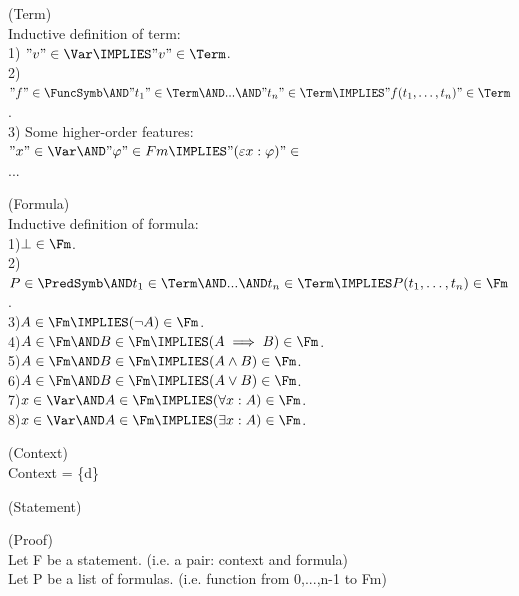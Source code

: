 \begin{definition}(Term)\\
Inductive definition of term:\\
1) $"v"\in\Var \IMPLIES "v"\in\Term$.\\
2) 
$"f"\in\FuncSymb\AND "t_1"\in\Term \AND ...\AND "t_n"\in\Term  \IMPLIES "f(t_1,\dots,t_n)"\in\Term$.\\
3) Some higher-order features:\\
$"x"\in\Var\AND"\varphi"\in Fm \IMPLIES "(\varepsilon x : \varphi)"\in $\\
...

\end{definition}

\begin{definition}(Formula)\\
Inductive definition of formula:\\
1)$\bot\in\Fm$.\\
2)$P\in\PredSymb\AND t_1\in\Term \AND ...\AND t_n\in\Term  \IMPLIES P(t_1,\dots,t_n)\in\Fm$.\\
3)$A\in\Fm \IMPLIES (\neg A)\in\Fm$.\\
4)$A\in\Fm \AND B\in\Fm \IMPLIES (A\implies B)\in\Fm$.\\
5)$A\in\Fm \AND B\in\Fm \IMPLIES (A\land B)\in\Fm$.\\
6)$A\in\Fm \AND B\in\Fm \IMPLIES (A\lor B)\in\Fm$.\\
7)$x\in\Var \AND A\in\Fm \IMPLIES (\forall x:A)\in\Fm$.\\
8)$x\in\Var \AND A\in\Fm \IMPLIES (\exists x:A)\in\Fm$.\\
\end{definition}

\begin{definition}(Context)\\
Context = \{d\}
\end{definition}

\begin{definition}(Statement)\\
\end{definition}

\begin{definition}(Proof)\\
Let F be a statement. (i.e. a pair: context and formula)\\
Let P be a list of formulas. (i.e. function from {0,...,n-1} to Fm)\\

\end{definition}



